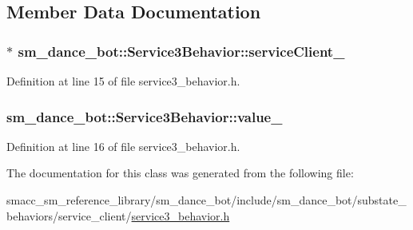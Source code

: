 \subsection{Member Data Documentation}
\subsubsection[{\texorpdfstring{service\+Client\+\_\+}{serviceClient_}}]{$\ast$ sm\+\_\+dance\+\_\+bot\+::\+Service3\+Behavior\+::service\+Client\+\_\+\hspace{0.3cm}{\ttfamily [private]}}\hypertarget{classsm__dance__bot_1_1Service3Behavior_afe77243f8c5938cf9c754897d41cceff}{}\label{classsm__dance__bot_1_1Service3Behavior_afe77243f8c5938cf9c754897d41cceff}


Definition at line 15 of file service3\+\_\+behavior.\+h.

\subsubsection[{\texorpdfstring{value\+\_\+}{value_}}]{ sm\+\_\+dance\+\_\+bot\+::\+Service3\+Behavior\+::value\+\_\+\hspace{0.3cm}{\ttfamily [private]}}\hypertarget{classsm__dance__bot_1_1Service3Behavior_a85d2c6056f1cc77bcfc0139c4ce71ba9}{}\label{classsm__dance__bot_1_1Service3Behavior_a85d2c6056f1cc77bcfc0139c4ce71ba9}


Definition at line 16 of file service3\+\_\+behavior.\+h.



The documentation for this class was generated from the following file\+:\begin{DoxyCompactItemize}
\item 
smacc\+\_\+sm\+\_\+reference\+\_\+library/sm\+\_\+dance\+\_\+bot/include/sm\+\_\+dance\+\_\+bot/substate\+\_\+behaviors/service\+\_\+client/\hyperlink{service3__behavior_8h}{service3\+\_\+behavior.\+h}\end{DoxyCompactItemize}

